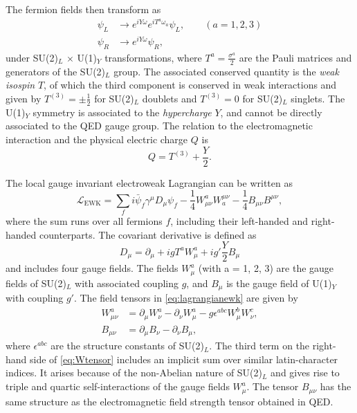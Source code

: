 The fermion fields then transform as
\begin{align}
  \psi_L & \rightarrow e^{iY\omega} e^{iT^a\omega_a} \psi_L, \qquad (a = 1, 2, 3) \\
  \psi_R & \rightarrow e^{iY\omega} \psi_R,
\end{align}
under SU(2)$_L$ $\times$ U(1)$_Y$ transformations, where $T^a=\frac{\sigma^a}{2}$ are the Pauli matrices and generators of the SU(2)$_L$ group.
The associated conserved quantity is the \emph{weak isospin} $T$, of which the third component is conserved in weak interactions and given by $T^{(3)} = \pm \frac{1}{2}$ for SU(2)$_L$ doublets and $T^{(3)} = 0$ for SU(2)$_L$ singlets.
The U(1)$_Y$ symmetry is associated to the \emph{hypercharge} $Y$, and cannot be directly associated to the QED gauge group.
The relation to the electromagnetic interaction and the physical electric charge $Q$ is
\begin{equation}
  Q = T^{(3)} + \frac{Y}{2}.
\end{equation}

\noindent The local gauge invariant electroweak Lagrangian can be written as
\begin{equation}
  \mathcal{L}_{\text{EWK}} = \sum_f i\bar{\psi}_{f}\gamma^\mu D_\mu \psi_{f} - \frac{1}{4}W_{\mu\nu}^aW^{\mu\nu}_{a} - \frac{1}{4} B_{\mu\nu}B^{\mu\nu},
  \label{eq:lagrangianewk}
\end{equation}
where the sum runs over all fermions $f$, including their left-handed and right-handed counterparts.
The covariant derivative is defined as
\begin{equation}
  D_\mu = \partial_\mu + igT^aW_\mu^a + ig'\frac{Y}{2}B_\mu
  \label{eq:covdevewk}
\end{equation}
and includes four gauge fields. The fields $W^a_\mu$ (with a = 1, 2, 3) are the gauge fields of SU(2)$_L$ with associated coupling $g$, and $B_\mu$ is the gauge field of U(1)$_Y$ with coupling $g'$.
The field tensors in \cref{eq:lagrangianewk} are given by
\begin{align}
  W_{\mu\nu}^a & = \partial_\mu W_\nu^a - \partial_\nu W_\mu^a - g \epsilon^{abc} W^b_\mu W^c_\nu, \label{eq:Wtensor} \\
  B_{\mu\nu}   & = \partial_\mu B_\nu - \partial_\nu B_\mu,
\end{align}
where $\epsilon^{abc}$ are the structure constants of SU(2)$_L$. The third term on the right-hand side of \cref{eq:Wtensor} includes an implicit sum over similar latin-character indices. It arises because of the non-Abelian nature of SU(2)$_L$ and gives rise to triple and quartic self-interactions of the gauge fields $W_{\mu}^a$.
The tensor $B_{\mu\nu}$ has the same structure as the electromagnetic field strength tensor obtained in QED.

